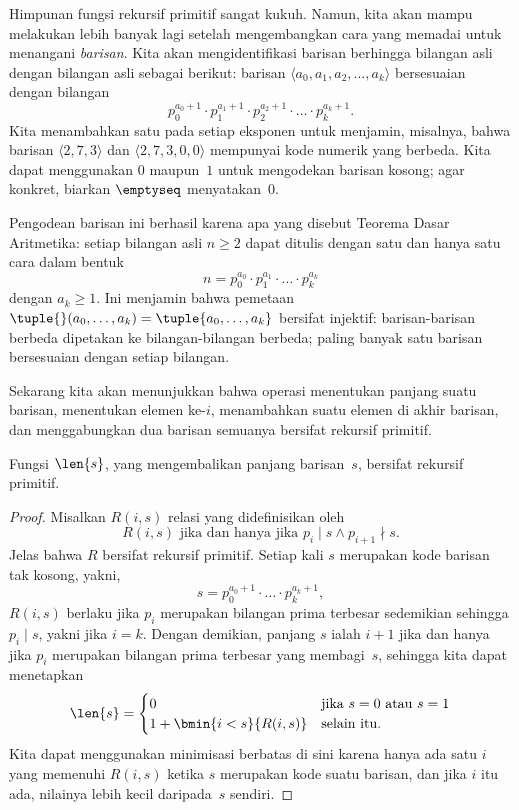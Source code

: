 \documentclass[../../../include/open-logic-section]{subfiles}
\begin{document}

Himpunan fungsi rekursif primitif sangat kukuh. Namun, kita akan mampu
melakukan lebih banyak lagi setelah mengembangkan cara yang memadai untuk
menangani \emph{barisan}. Kita akan mengidentifikasi barisan berhingga bilangan
asli dengan bilangan asli sebagai berikut: barisan
$\langle a_0,a_1,a_2,\dots,a_k\rangle$ bersesuaian dengan bilangan
\[
p_0^{a_0+1} \cdot p_1^{a_1+1} \cdot p_2^{a_2+1} \cdot \dots \cdot
p_k^{a_k+1}.
\]
Kita menambahkan satu pada setiap eksponen untuk menjamin, misalnya, bahwa
barisan $\langle 2,7,3\rangle$ dan $\langle 2,7,3,0,0\rangle$ mempunyai kode
numerik yang berbeda. Kita dapat menggunakan $0$ maupun~$1$ untuk mengodekan
barisan kosong; agar konkret, biarkan $\emptyseq$ menyatakan~$0$.

Pengodean barisan ini berhasil karena apa yang disebut Teorema Dasar
Aritmetika: setiap bilangan asli $n\ge2$ dapat ditulis dengan satu dan hanya
satu cara dalam bentuk
\[
n = p_0^{a_0} \cdot p_1^{a_1} \cdot \dots \cdot p_k^{a_k}
\]
dengan $a_k\ge1$. Ini menjamin bahwa pemetaan $\tuple{}(a_0,\dots,a_k)
=\tuple{a_0,\dots,a_k}$ bersifat injektif: barisan-barisan berbeda dipetakan
ke bilangan-bilangan berbeda; paling banyak satu barisan bersesuaian dengan
setiap bilangan.

Sekarang kita akan menunjukkan bahwa operasi menentukan panjang suatu
barisan, menentukan elemen ke-$i$, menambahkan suatu elemen di akhir barisan,
dan menggabungkan dua barisan semuanya bersifat rekursif primitif.

\begin{prop}
  Fungsi $\len{s}$, yang mengembalikan panjang barisan~$s$, bersifat rekursif
  primitif.
\end{prop}

\begin{proof}
  Misalkan $R(i,s)$ relasi yang didefinisikan oleh
  \[
  R(i, s) \text{ jika dan hanya jika }
  p_i \mid s \land p_{i+1} \nmid s.
  \]
  Jelas bahwa $R$ bersifat rekursif primitif. Setiap kali $s$ merupakan kode
  barisan tak kosong, yakni,
  \[
  s = p_0^{a_0+1} \cdot \dots \cdot p_{k}^{a_{k}+1},
  \]
  $R(i,s)$ berlaku jika $p_i$ merupakan bilangan prima terbesar sedemikian
  sehingga $p_i\mid s$, yakni jika $i=k$. Dengan demikian, panjang $s$ ialah
  $i+1$ jika dan hanya jika $p_i$ merupakan bilangan prima terbesar yang
  membagi~$s$, sehingga kita dapat menetapkan
  \[
  \len{s} =
  \begin{cases}
    0 & \text{jika $s = 0$ atau $s = 1$} \\
    1 + \bmin{i < s}{R(i, s)} & \text{selain itu.}
  \end{cases}
  \]
  Kita dapat menggunakan minimisasi berbatas di sini karena hanya ada satu
  $i$ yang memenuhi $R(i,s)$ ketika $s$ merupakan kode suatu barisan, dan
  jika $i$ itu ada, nilainya lebih kecil daripada~$s$ sendiri.
\end{proof}
\end{document}
